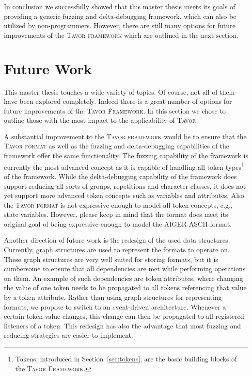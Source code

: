 In conclusion we successfully showed that this master thesis meets its goals of providing a generic fuzzing and delta-debugging framework, which can also be utilized by non-programmers. However, there are still many options for future improvements of the \textsc{Tavor framework} which are outlined in the next section.

\section{Future Work}
\label{sec:futureWork}

This master thesis touches a wide variety of topics. Of course, not all of them have been explored completely. Indeed there is a great number of options for future improvements of the \textsc{Tavor Framework}. In this section we chose to outline those with the most impact to the applicability of \textsc{Tavor}.

A substantial improvement to the \textsc{Tavor framework} would be to ensure that the \textsc{Tavor format} as well as the fuzzing and delta-debugging capabilities of the framework offer the same functionality. The fuzzing capability of the framework is currently the most advanced concept as it is capable of handling all token types\footnote{Tokens, introduced in Section~\ref{sec:tokens}, are the basic building blocks of the \textsc{Tavor Framework}.} of the framework. While the delta-debugging capability of the framework does support reducing all sorts of groups, repetitions and character classes, it does not yet support more advanced token concepts such as variables and attributes. Also the \textsc{Tavor format} is not expressive enough to model all token concepts, e.g., state variables. However, please keep in mind that the format does meet its original goal of being expressive enough to model the AIGER ASCII format.

Another direction of future work is the redesign of the used data structures. Currently, graph structures are used to represent the formats to operate on. These graph structures are very well suited for storing formats, but it is cumbersome to ensure that all dependencies are met while performing operations on them. An example of such dependencies are token attributes, where changing the value of one token needs to be propagated to all tokens referencing that value by a token attribute. Rather than using graph structures for representing formats, we propose to switch to an event-driven architecture. Whenever a certain token value changes, this change can then be propagated to all registered listeners of a token. This redesign has also the advantage that most fuzzing and reducing strategies are easier to implement.

